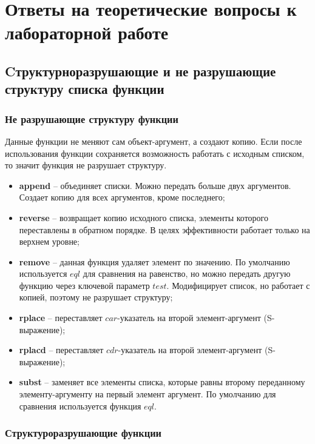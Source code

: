 \documentclass[a4paper,14pt, unknownkeysallowed]{extreport}
\begin{document}
\chapter{Ответы на теоретические вопросы к лабораторной работе}

\section{Cтруктурноразрушающие и не разрушающие структуру списка функции}

\subsection{Не разрушающие структуру функции}

Данные функции не меняют сам объект-аргумент, а создают копию. Если после использования функции сохраняется возможность работать с исходным списком, то значит функция не разрушает структуру.

\begin{itemize}
	\item \textbf{append} -- объединяет списки. Можно передать больше двух аргументов. Создает копию для всех аргументов, кроме последнего;
	\item \textbf{reverse} -- возвращает копию исходного списка, элементы которого переставлены в обратном порядке. В целях эффективности работает только на верхнем уровне;
	\item \textbf{remove} -- данная функция удаляет элемент по значению. По умолчанию используется $eql$ для сравнения на равенство, но можно передать другую функцию через ключевой параметр $test$. Модифицирует список, но работает с копией, поэтому не разрушает структуру;
	\item \textbf{rplace} -- переставляет $car$-указатель на второй элемент-аргумент (S-выражение);
	\item \textbf{rplacd} -- переставляет $cdr$-указатель на второй элемент-аргумент (S-выражение);
	\item \textbf{subst} -- заменяет все элементы списка, которые равны второму переданному элементу-аргументу на первый элемент аргумент. По умолчанию для сравнения используется функция $eql$.
\end{itemize}

\subsection{Структуроразрушающие функции}
\end{document}
